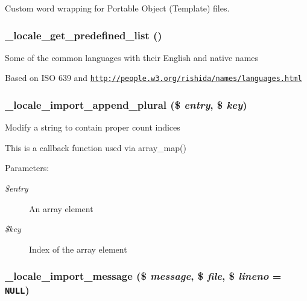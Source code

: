 Custom word wrapping for Portable Object (Template) files. \hypertarget{group__locale_gfac9d59fd436286a3f3738140ce96e82}{
\subsubsection[{\_\-locale\_\-get\_\-predefined\_\-list}]{\setlength{\rightskip}{0pt plus 5cm}\_\-locale\_\-get\_\-predefined\_\-list ()}}
\label{group__locale_gfac9d59fd436286a3f3738140ce96e82}


Some of the common languages with their English and native names

Based on ISO 639 and \href{http://people.w3.org/rishida/names/languages.html}{\tt http://people.w3.org/rishida/names/languages.html} \hypertarget{group__locale_gd0abff75e696db162d5b90acda071371}{
\subsubsection[{\_\-locale\_\-import\_\-append\_\-plural}]{\setlength{\rightskip}{0pt plus 5cm}\_\-locale\_\-import\_\-append\_\-plural (\$ {\em entry}, \/  \$ {\em key})}}
\label{group__locale_gd0abff75e696db162d5b90acda071371}


Modify a string to contain proper count indices

This is a callback function used via array\_\-map()

\begin{Desc}
\item[Parameters:]
\begin{description}
\item[{\em \$entry}]An array element \item[{\em \$key}]Index of the array element \end{description}
\end{Desc}
\hypertarget{group__locale_ga6bdc2dc6954e30cabefa65ca596e9d0}{
\subsubsection[{\_\-locale\_\-import\_\-message}]{\setlength{\rightskip}{0pt plus 5cm}\_\-locale\_\-import\_\-message (\$ {\em message}, \/  \$ {\em file}, \/  \$ {\em lineno} = {\tt NULL})}}
\label{group__locale_ga6bdc2dc6954e30cabefa65ca596e9d0}


